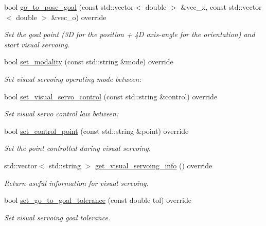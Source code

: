 \begin{DoxyCompactItemize}
\item 
bool \hyperlink{classVisualServoingServer_a77f26ac40c67d7a9b7e4ad7840532681}{go\+\_\+to\+\_\+pose\+\_\+goal} (const std\+::vector$<$ double $>$ \&vec\+\_\+x, const std\+::vector$<$ double $>$ \&vec\+\_\+o) override
\begin{DoxyCompactList}\small\item\em Set the goal point (3D for the position + 4D axis-\/angle for the orientation) and start visual servoing. \end{DoxyCompactList}\item 
bool \hyperlink{classVisualServoingServer_a6d9ec4489caebf0a52b2e5ee149aeb6d}{set\+\_\+modality} (const std\+::string \&mode) override
\begin{DoxyCompactList}\small\item\em Set visual servoing operating mode between\+: \end{DoxyCompactList}\item 
bool \hyperlink{classVisualServoingServer_a2f28e67b1dd44d9afba4a79fd89f4bc8}{set\+\_\+visual\+\_\+servo\+\_\+control} (const std\+::string \&control) override
\begin{DoxyCompactList}\small\item\em Set visual servo control law between\+: \end{DoxyCompactList}\item 
bool \hyperlink{classVisualServoingServer_a4a20a08fec9cfa4765e1245cfce5f9a8}{set\+\_\+control\+\_\+point} (const std\+::string \&point) override
\begin{DoxyCompactList}\small\item\em Set the point controlled during visual servoing. \end{DoxyCompactList}\item 
std\+::vector$<$ std\+::string $>$ \hyperlink{classVisualServoingServer_af085e2c5d4c4cfe940b3564b4ba69af6}{get\+\_\+visual\+\_\+servoing\+\_\+info} () override
\begin{DoxyCompactList}\small\item\em Return useful information for visual servoing. \end{DoxyCompactList}\item 
bool \hyperlink{classVisualServoingServer_a0efdb8edb2e4b91dc3168b5051b27f56}{set\+\_\+go\+\_\+to\+\_\+goal\+\_\+tolerance} (const double tol) override
\begin{DoxyCompactList}\small\item\em Set visual servoing goal tolerance. \end{DoxyCompactList}\item 

\end{DoxyCompactItemize}

